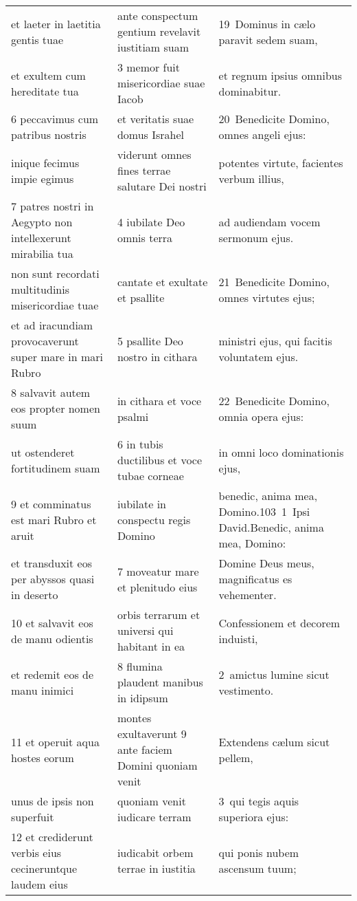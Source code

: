 \documentclass{article}
\begin{document}
\begin{longtable}{@{}p{}p{}p{}@{}}
et laeter in laetitia gentis tuae	&	ante conspectum gentium revelavit iustitiam suam	&	19 Dominus in cælo paravit sedem suam,	\\
et exultem cum hereditate tua	&	3 memor fuit misericordiae suae Iacob	&	et regnum ipsius omnibus dominabitur.	\\
6 peccavimus cum patribus nostris	&	et veritatis suae domus Israhel	&	20 Benedicite Domino, omnes angeli ejus:	\\
inique fecimus impie egimus	&	viderunt omnes fines terrae salutare Dei nostri	&	potentes virtute, facientes verbum illius,	\\
7 patres nostri in Aegypto non intellexerunt mirabilia tua	&	4 iubilate Deo omnis terra	&	ad audiendam vocem sermonum ejus.	\\
non sunt recordati multitudinis misericordiae tuae	&	cantate et exultate et psallite	&	21 Benedicite Domino, omnes virtutes ejus;	\\
et ad iracundiam provocaverunt super mare in mari Rubro	&	5 psallite Deo nostro in cithara	&	ministri ejus, qui facitis voluntatem ejus.	\\
8 salvavit autem eos propter nomen suum	&	in cithara et voce psalmi	&	22 Benedicite Domino, omnia opera ejus:	\\
ut ostenderet fortitudinem suam	&	6 in tubis ductilibus et voce tubae corneae	&	in omni loco dominationis ejus,	\\
9 et comminatus est mari Rubro et aruit	&	iubilate in conspectu regis Domino	&	benedic, anima mea, Domino.103 1 Ipsi David.Benedic, anima mea, Domino:	\\
et transduxit eos per abyssos quasi in deserto	&	7 moveatur mare et plenitudo eius	&	Domine Deus meus, magnificatus es vehementer.	\\
10 et salvavit eos de manu odientis	&	orbis terrarum et universi qui habitant in ea	&	Confessionem et decorem induisti,	\\
et redemit eos de manu inimici	&	8 flumina plaudent manibus in idipsum	&	2 amictus lumine sicut vestimento.	\\
11 et operuit aqua hostes eorum	&	montes exultaverunt 9 ante faciem Domini quoniam venit	&	Extendens cælum sicut pellem,	\\
unus de ipsis non superfuit	&	quoniam venit iudicare terram	&	3 qui tegis aquis superiora ejus:	\\
12 et crediderunt verbis eius cecineruntque laudem eius	&	iudicabit orbem terrae in iustitia	&	qui ponis nubem ascensum tuum;	\\

\end{longtable}
\end{document}
